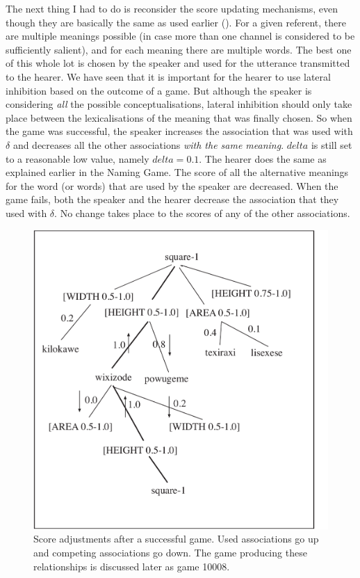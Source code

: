The next thing I had to do is reconsider the score
updating mechanisms, even though they are basically 
the same as used earlier (). 
For a given referent, there are multiple meanings possible
(in case more than one channel is considered to 
be sufficiently salient), and
for each meaning there are multiple words. The best 
one of this whole lot is chosen by the speaker and used
for the utterance transmitted to the hearer. We have 
seen that it is important for the hearer to use lateral
inhibition based on the outcome of a game. But although 
the speaker is considering {\itshape all} the possible 
conceptualisations, lateral
inhibition should only take place between the 
lexicalisations of the meaning that was finally chosen. 
So when the game was successful, 
the speaker increases the association that was used with $\delta$
and decreases all the other associations
{\itshape with the same meaning}. $delta$ is still set to a reasonable
low value, namely $delta = 0.1$. 
The hearer does the same as explained earlier in 
the Naming Game. The score of all
the alternative meanings for the word (or words) 
that are used by the speaker are decreased. 
When the game fails, both the speaker and the hearer 
decrease the association that they used with $\delta$. No
change takes place to the scores of any of the 
other associations. 
\begin{figure}[htbp]
  \centerline{\includegraphics[width=.50\textwidth]{chap6/figs/incr-decr2}}
\caption{\label{incr-decr2}
Score adjustments after a successful game. Used 
associations go up and competing associations go down.
The game producing these relationships is discussed
later as game 10008.}
\end{figure}

